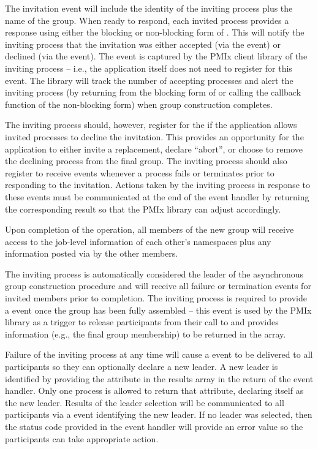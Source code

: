 The invitation event will include the identity of the inviting process plus the name of the group. When ready to respond, each invited process provides a response using either the blocking or non-blocking form of . This will notify the inviting process that the invitation was either accepted (via the  event) or declined (via the  event). The  event is captured by the \ac{PMIx} client library of the inviting process – i.e., the application itself does not need to register for this event. The library will track the number of accepting processes and alert the inviting process (by returning from the blocking form of  or calling the callback function of the non-blocking form) when group construction completes.

The inviting process should, however, register for the  if the application allows invited processes to decline the invitation. This provides an opportunity for the application to either invite a replacement, declare ``abort'', or choose to remove the declining process from the final group. The inviting process should also register to receive  events whenever a process fails or terminates prior to responding to the invitation. Actions taken by the inviting process in response to these events must be communicated at the end of the event handler by returning the corresponding result so that the \ac{PMIx} library can adjust accordingly.

Upon completion of the operation, all members of the new group will receive access to the job-level information of each other’s namespaces plus any information posted via  by the other members.

The inviting process is automatically considered the leader of the asynchronous group construction procedure and will receive all failure or termination events for invited members prior to completion. The inviting process is required to provide a  event once the group has been fully assembled – this event is used by the \ac{PMIx} library as a trigger to release participants from their call to  and provides information (e.g., the final group membership) to be returned in the  array.

Failure of the inviting process at any time will cause a  event to be delivered to all participants so they can optionally declare a new leader. A new leader is identified by providing the  attribute in the results array in the return of the event handler. Only one process is allowed to return that attribute, declaring itself as the new leader. Results of the leader selection will be communicated to all participants via a  event identifying the new leader. If no leader was selected, then the status code provided in the event handler will provide an error value so the participants can take appropriate action.

